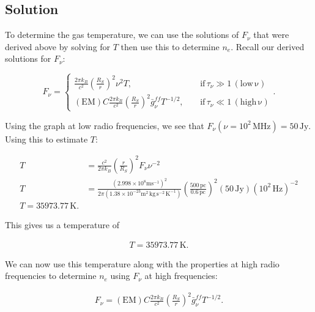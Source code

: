 \documentclass[12pt]{article}
\begin{document}
\subsection*{Solution}

To determine the gas temperature, we can use the solutions of $F_\nu$ that were derived above by solving for $T$ then use this to determine $n_e$. Recall our derived solutions for $F_\nu$:

\begin{equation*}
F_\nu =
\left\{
\begin{aligned}
\frac{2\pi k_B}{c^2} \left(\frac{R_S}{r}\right)^2 \nu^2T,       ~~~~~& \mathrm{if}\,\tau_\nu \gg 1 \,\mathrm{(low\,\nu)} \\
(\mathrm{EM})C \frac{2\pi k_B}{c^2} \left(\frac{R_S}{r}\right)^2 \bar{g}_\nu^{ff} T^{-1/2},~~~~~& \mathrm{if}\,\tau_\nu \ll 1 \,\mathrm{(high\,\nu)}
\end{aligned}
\right.
.
\end{equation*}

{\noindent}Using the graph at low radio frequencies, we see that $F_\nu(\nu=10^2\,\mathrm{MHz}) = 50\,\mathrm{Jy}$. Using this to estimate $T$:

\begin{equation*}
\begin{split}
    T &= \frac{c^2}{2\pi k_B} \left(\frac{r}{R_S}\right)^2F_\nu\nu^{-2} \\
    T &= \frac{(2.998\times10^8\mathrm{ms^{-1}})^2}{2\pi (1.38\times10^{-23}\mathrm{m^2\,kg\,s^{-2}\,K^{-1}})} \left(\frac{500\,\mathrm{pc}}{0.6\,\mathrm{pc}}\right)^2(50\,\mathrm{Jy})(10^2\,\mathrm{Hz})^{-2} \\
    T = 35973.77\,\mathrm{K}.
\end{split}
\end{equation*}

{\noindent}This gives us a temperature of

\begin{align*}
    \boxed{T = 35973.77\,\mathrm{K}}.
\end{align*}

{\noindent}We can now use this temperature along with the properties at high radio frequencies to determine $n_e$ using $F_\nu$ at high frequencies:

\begin{equation*}
\begin{split}
    F_\nu = (\mathrm{EM})C \frac{2\pi k_B}{c^2} \left(\frac{R_S}{r}\right)^2 \bar{g}_\nu^{ff} T^{-1/2}.
\end{split}
\end{equation*}
\end{document}
